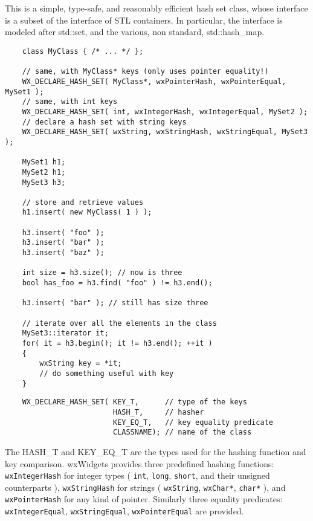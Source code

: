 \section{}\label{wxhashset}

This is a simple, type-safe, and reasonably efficient hash set class,
whose interface is a subset of the interface of STL containers. In
particular, the interface is modeled after std::set, and the various,
non standard, std::hash\_map.


\begin{verbatim}
    class MyClass { /* ... */ };

    // same, with MyClass* keys (only uses pointer equality!)
    WX_DECLARE_HASH_SET( MyClass*, wxPointerHash, wxPointerEqual, MySet1 );
    // same, with int keys
    WX_DECLARE_HASH_SET( int, wxIntegerHash, wxIntegerEqual, MySet2 );
    // declare a hash set with string keys
    WX_DECLARE_HASH_SET( wxString, wxStringHash, wxStringEqual, MySet3 );

    MySet1 h1;
    MySet2 h1;
    MySet3 h3;

    // store and retrieve values
    h1.insert( new MyClass( 1 ) );

    h3.insert( "foo" );
    h3.insert( "bar" );
    h3.insert( "baz" );

    int size = h3.size(); // now is three
    bool has_foo = h3.find( "foo" ) != h3.end();

    h3.insert( "bar" ); // still has size three

    // iterate over all the elements in the class
    MySet3::iterator it;
    for( it = h3.begin(); it != h3.end(); ++it )
    {
        wxString key = *it;
        // do something useful with key
    }
\end{verbatim}


\begin{verbatim}
    WX_DECLARE_HASH_SET( KEY_T,      // type of the keys
                         HASH_T,     // hasher
                         KEY_EQ_T,   // key equality predicate
                         CLASSNAME); // name of the class
\end{verbatim}

The HASH\_T and KEY\_EQ\_T are the types
used for the hashing function and key comparison. wxWidgets provides
three predefined hashing functions: {\tt wxIntegerHash}
for integer types ( {\tt int}, {\tt long}, {\tt short},
and their unsigned counterparts ), {\tt wxStringHash} for strings
( {\tt wxString}, {\tt wxChar*}, {\tt char*} ), and
{\tt wxPointerHash} for any kind of pointer.
Similarly three equality predicates:
{\tt wxIntegerEqual}, {\tt wxStringEqual}, {\tt wxPointerEqual} are provided.


